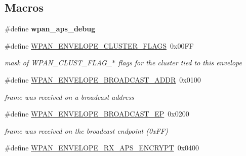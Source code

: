 \subsection*{Macros}
\begin{DoxyCompactItemize}
\item 
\hypertarget{group__wpan__aps_gabb1c4414656c0126916692f8c93495bc}{\#define {\bfseries wpan\-\_\-aps\-\_\-debug}}\label{group__wpan__aps_gabb1c4414656c0126916692f8c93495bc}

\item 
\hypertarget{group__wpan__aps_ga6a6e8a32dc7117f44bdca2802a1e54aa}{\#define \hyperlink{group__wpan__aps_ga6a6e8a32dc7117f44bdca2802a1e54aa}{W\-P\-A\-N\-\_\-\-E\-N\-V\-E\-L\-O\-P\-E\-\_\-\-C\-L\-U\-S\-T\-E\-R\-\_\-\-F\-L\-A\-G\-S}~0x00\-F\-F}\label{group__wpan__aps_ga6a6e8a32dc7117f44bdca2802a1e54aa}

\begin{DoxyCompactList}\small\item\em mask of W\-P\-A\-N\-\_\-\-C\-L\-U\-S\-T\-\_\-\-F\-L\-A\-G\-\_\-$\ast$ flags for the cluster tied to this envelope \end{DoxyCompactList}\item 
\hypertarget{group__wpan__aps_ga92a0f27267b04aa691e184b428e8f7c6}{\#define \hyperlink{group__wpan__aps_ga92a0f27267b04aa691e184b428e8f7c6}{W\-P\-A\-N\-\_\-\-E\-N\-V\-E\-L\-O\-P\-E\-\_\-\-B\-R\-O\-A\-D\-C\-A\-S\-T\-\_\-\-A\-D\-D\-R}~0x0100}\label{group__wpan__aps_ga92a0f27267b04aa691e184b428e8f7c6}

\begin{DoxyCompactList}\small\item\em frame was received on a broadcast address \end{DoxyCompactList}\item 
\hypertarget{group__wpan__aps_ga9572c340b083c6a51b0473fee184ea2c}{\#define \hyperlink{group__wpan__aps_ga9572c340b083c6a51b0473fee184ea2c}{W\-P\-A\-N\-\_\-\-E\-N\-V\-E\-L\-O\-P\-E\-\_\-\-B\-R\-O\-A\-D\-C\-A\-S\-T\-\_\-\-E\-P}~0x0200}\label{group__wpan__aps_ga9572c340b083c6a51b0473fee184ea2c}

\begin{DoxyCompactList}\small\item\em frame was received on the broadcast endpoint (0x\-F\-F) \end{DoxyCompactList}\item 
\hypertarget{group__wpan__aps_ga3bf12c3b9fd0afac2c9f58de8e7c38e9}{\#define \hyperlink{group__wpan__aps_ga3bf12c3b9fd0afac2c9f58de8e7c38e9}{W\-P\-A\-N\-\_\-\-E\-N\-V\-E\-L\-O\-P\-E\-\_\-\-R\-X\-\_\-\-A\-P\-S\-\_\-\-E\-N\-C\-R\-Y\-P\-T}~0x0400}\label{group__wpan__aps_ga3bf12c3b9fd0afac2c9f58de8e7c38e9}


\end{DoxyCompactItemize}
